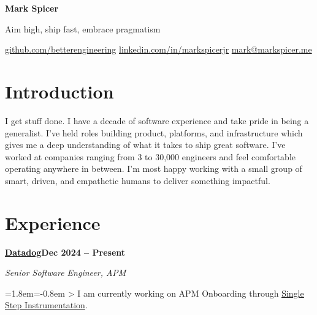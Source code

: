\documentclass[10pt,letterpaper]{article}
\newcommand{\uhref}[2]{\href{#1}{\uline{#2}}}
\begin{document}
{\LARGE\bfseries Mark Spicer}\par
\vspace{1pt}
{\footnotesize\color{mygray} Aim high, ship fast, embrace pragmatism}\par
\vspace{1pt}
{\footnotesize\color{mygray}%
\href{https://github.com/betterengineering}{github.com/betterengineering} \quad
\href{https://www.linkedin.com/in/markspicerjr/}{linkedin.com/in/markspicerjr} \quad
\href{mailto:mark@markspicer.me}{mark@markspicer.me}%
}\par

\section{Introduction}
{\footnotesize I get stuff done. I have a decade of software experience and take pride in being a generalist. I've held roles building product, platforms, and infrastructure which gives me a deep understanding of what it takes to ship great software. I've worked at companies ranging from 3 to 30,000 engineers and feel comfortable operating anywhere in between. I'm most happy working with a small group of smart, driven, and empathetic humans to deliver something impactful.}

\section{Experience}

\newcommand{\company}[3]{%
    \vspace{8pt}%
    {\small\bfseries #1\hfill{\footnotesize\color{mygray}#3}}\par\nobreak
    \if\relax\detokenize{#2}\relax\else{\footnotesize\color{mygray}#2}\par\nobreak\fi
}
\newcommand{\role}[2]{%
    \vspace{5pt}%
    {\footnotesize\itshape #1\hfill\color{mygray}#2}\par\nobreak
}
\newcommand{\resumebullet}[1]{%
    \vspace{1pt}%
    \begingroup\footnotesize\color{black!85}%
    \leftskip=1.8em\parindent=-0.8em%
    \indent> #1\par
    \endgroup
}

\company{\href{https://www.datadoghq.com}{Datadog}}{}{Dec 2024 -- Present}
\role{Senior Software Engineer, APM}{}
\resumebullet{I am currently working on APM Onboarding through \uhref{https://docs.datadoghq.com/tracing/trace_collection/automatic_instrumentation/single-step-apm/kubernetes}{Single Step Instrumentation}.}
\end{document}
